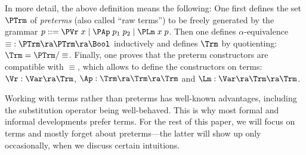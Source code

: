In more detail, %
the above definition means %
the following: One first defines  the set $\PTrm$ of 
\emph{preterms} (also called ``raw terms'') to be freely generated by the %
grammar 
%
$
p ::= \PVr\;x  \mid \PAp\;p_1\;p_2  \mid \PLm\;x\;p 
$. 
%
Then one defines $\alpha$-equivalence 
$\equiv\; : 
\PTrm \ra \PTrm \ra 
\Bool$  
inductively %
and defines $\Trm$ by quotienting: 
$\Trm = \PTrm/\equiv$. 
%
Finally, one proves that the preterm constructors are compatible with $\equiv$, 
which allows to define the constructors on terms:  
$\Vr : \Var \ra \Trm$, $\Ap : \Trm \ra \Trm \ra \Trm$ 
and $\Lm : \Var \ra \Trm \ra \Trm$. 
%

Working with terms rather than preterms has %
well-known advantages, including  
the substitution operator being well-behaved. 
This is why most formal and informal developments prefer terms. 
% 
For the rest of this paper, we will focus on terms and mostly forget about preterms---the latter will show up only occasionally, when we discuss certain intuitions. 







